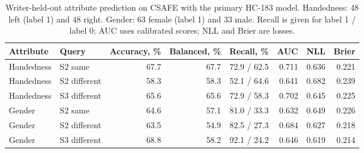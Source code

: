 \documentclass[10pt,a4paper]{article}
\begin{document}
\begin{table}[ht]
\caption{Writer-held-out attribute prediction on CSAFE with the primary HC-183 model. Handedness: 48 left (label 1) and 48 right. Gender: 63 female (label 1) and 33 male. Recall is given for label 1 / label 0; AUC uses calibrated scores; NLL and Brier are losses.}\label{tab:p2attr}
\centering\footnotesize
\begin{tabular}{llrrrrrr}\toprule
Attribute & Query & Accuracy, \% & Balanced, \% & Recall, \% & AUC & NLL & Brier\\\midrule
Handedness & S2 same & 67.7 & 67.7 & 72.9 / 62.5 & 0.711 & 0.636 & 0.221 \\
Handedness & S2 different & 58.3 & 58.3 & 52.1 / 64.6 & 0.641 & 0.682 & 0.239 \\
Handedness & S3 different & 65.6 & 65.6 & 72.9 / 58.3 & 0.702 & 0.645 & 0.225 \\
Gender & S2 same & 64.6 & 57.1 & 81.0 / 33.3 & 0.632 & 0.649 & 0.226 \\
Gender & S2 different & 63.5 & 54.9 & 82.5 / 27.3 & 0.684 & 0.627 & 0.218 \\
Gender & S3 different & 68.8 & 58.2 & 92.1 / 24.2 & 0.646 & 0.619 & 0.214 \\
\bottomrule
\end{tabular}
\end{table}
\end{document}
